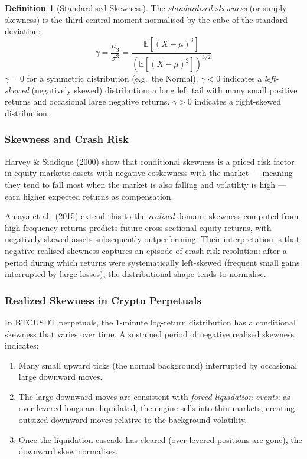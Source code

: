 \documentclass[12pt, a4paper]{article}
\theoremstyle{plain}
\theoremstyle{definition}
\newtheorem{definition}{Definition}[section]
\newcommand{\E}{\mathbb{E}}
\begin{document}
\begin{definition}[Standardised Skewness]
  The \emph{standardised skewness} (or simply skewness) is the third
  central moment normalised by the cube of the standard deviation:
  \begin{equation}
    \gamma = \frac{\mu_3}{\sigma^3}
           = \frac{\E[(X - \mu)^3]}{\left(\E[(X-\mu)^2]\right)^{3/2}}
    \label{eq:skewness}
  \end{equation}
  $\gamma = 0$ for a symmetric distribution (e.g.\ the Normal).
  $\gamma < 0$ indicates a \emph{left-skewed} (negatively skewed)
  distribution: a long left tail with many small positive returns and
  occasional large negative returns.  $\gamma > 0$ indicates a right-skewed
  distribution.
\end{definition}

\subsubsection{Skewness and Crash Risk}

Harvey \& Siddique (2000) show that conditional skewness is a priced
risk factor in equity markets: assets with negative coskewness with the
market --- meaning they tend to fall most when the market is also falling
and volatility is high --- earn higher expected returns as compensation.

Amaya et al.\ (2015) extend this to the \emph{realised} domain: skewness
computed from high-frequency returns predicts future cross-sectional
equity returns, with negatively skewed assets subsequently
outperforming.  Their interpretation is that negative realised skewness
captures an episode of crash-risk resolution: after a period during which
returns were systematically left-skewed (frequent small gains interrupted
by large losses), the distributional shape tends to normalise.

\subsubsection{Realized Skewness in Crypto Perpetuals}

In BTCUSDT perpetuals, the 1-minute log-return distribution has a
conditional skewness that varies over time.  A sustained period of
negative realised skewness indicates:

\begin{enumerate}
  \item Many small upward ticks (the normal background) interrupted by
        occasional large downward moves.
  \item The large downward moves are consistent with \emph{forced liquidation
        events}: as over-levered longs are liquidated, the engine sells
        into thin markets, creating outsized downward moves relative to
        the background volatility.
  \item Once the liquidation cascade has cleared (over-levered positions
        are gone), the downward skew normalises.
\end{enumerate}
\end{document}
